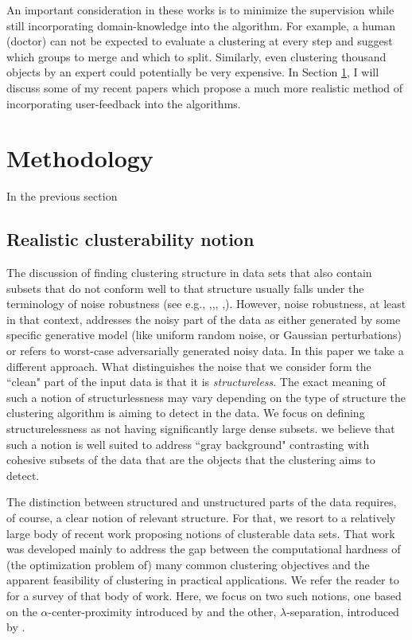 \documentclass[11pt]{article}
\begin{document}
\vspace{0.1in}\noindent An important consideration in these works is to minimize the supervision while still incorporating domain-knowledge into the algorithm. For example, a human (doctor) can not be expected to evaluate a clustering at every step and suggest which groups to merge and which to split. Similarly, even clustering thousand objects by an expert could potentially be very expensive. In Section \ref{section:methodology}, I will discuss some of my recent papers which propose a much more realistic method of incorporating user-feedback into the algorithms.


\section{Methodology}
\label{section:methodology}
In the previous section
\subsection{Realistic clusterability notion}
The discussion of finding clustering structure in data sets that also contain subsets that do not conform well to that structure usually falls under the terminology of noise robustness (see e.g., \cite{balcan2012clustering},\cite{ackerman2009clusterability},\cite{dave1993robust}, \cite{cuesta1997trimmed},\cite{garcia2008general}). However, noise robustness, at least in that context, addresses the noisy part of the data as either generated by some specific generative model (like uniform random noise, or Gaussian perturbations) or refers to worst-case adversarially generated noisy data. In this paper we take a different approach. What distinguishes the noise that we consider form the ``clean" part of the input data is that it is \emph{structureless}. The exact meaning of such a notion of structurlessness may vary depending on the type of structure the clustering algorithm is aiming to detect in the data. We focus on defining structurelessness as  not having significantly large dense subsets. we believe that such a notion is well suited to address ``gray background" contrasting with cohesive subsets of the data that are the objects that the clustering aims to detect. 

The distinction between structured and unstructured parts of the data requires, of course, a clear notion of relevant structure. For that, we resort to a relatively large body of recent work proposing notions of clusterable data sets. That work was developed mainly to address the gap between the computational hardness of (the optimization problem of) many common clustering objectives and the apparent feasibility of clustering in practical applications. We refer the reader to \cite{ben2015computational} for a survey of that body of work. Here, we focus on two such notions, one based on the $\alpha$-center-proximity introduced by \cite{awasthi2012center} and the other, $\lambda$-separation, introduced by \cite{ben2014clustering}.
\end{document}
